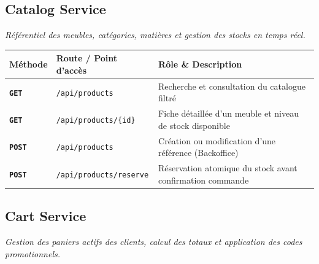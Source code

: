 \documentclass[10pt,a4paper]{article}
\begin{document}
\vspace{3pt}

\subsection{Catalog Service}
\textit{Référentiel des meubles, catégories, matières et gestion des stocks en temps réel.}

\begin{center}
\renewcommand{\arraystretch}{1.08}
\begin{tabularx}{\textwidth}{@{} l p{6.8cm} >{\raggedright\arraybackslash}X @{}}
\toprule[0.8pt]
\rowcolor{hdrcolor}
\textbf{Méthode} & \textbf{Route / Point d'accès} & \textbf{Rôle \& Description} \\
\midrule
\textcolor{syncblue}{\texttt{\textbf{GET}}}  & \texttt{/api/products} & Recherche et consultation du catalogue filtré \\
\textcolor{syncblue}{\texttt{\textbf{GET}}}  & \texttt{/api/products/\{id\}} & Fiche détaillée d'un meuble et niveau de stock disponible \\
\textcolor{postgreen}{\texttt{\textbf{POST}}} & \texttt{/api/products} & Création ou modification d'une référence (Backoffice) \\
\textcolor{postgreen}{\texttt{\textbf{POST}}} & \texttt{/api/products/reserve} & Réservation atomique du stock avant confirmation commande \\
\bottomrule[0.8pt]
\end{tabularx}
\end{center}

\vspace{3pt}

\subsection{Cart Service}
\textit{Gestion des paniers actifs des clients, calcul des totaux et application des codes promotionnels.}
\end{document}

